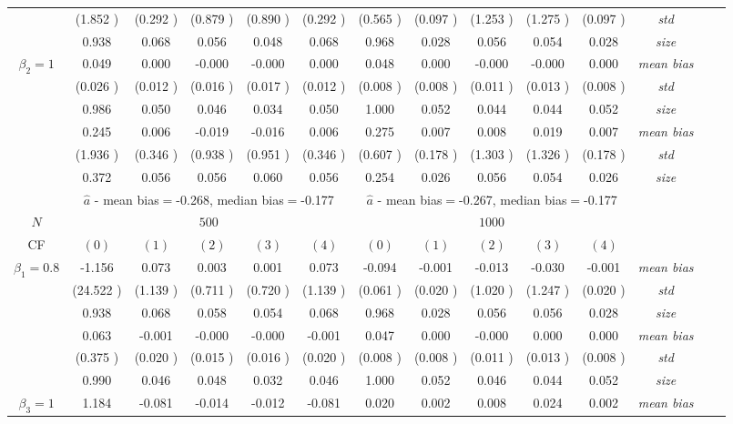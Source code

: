\begin{table}
\begin{threeparttable}
{\begin{tabular}{|c|c|c|c|c|c|c|c|c|c|c|c|c|c|}
&(1.852 )&(0.292 )&(0.879 )&(0.890 )&(0.292 )&(0.565 )&(0.097 )&(1.253 )&(1.275 )&(0.097 )&\textit{std}\\ 
& 0.938 & 0.068 &0.056 &0.048 &0.068 &0.968& 0.028 &0.056 &0.054& 0.028 &\textit{size} \\ \midrule 
\multirow{4}{*}{$\beta_2=1$}& 0.049 & 0.000 &-0.000 &-0.000 &0.000 &0.048& 0.000 &-0.000 &-0.000& 0.000 &\textit{mean bias} \\ 
&(0.026 )&(0.012 )&(0.016 )&(0.017 )&(0.012 )&(0.008 )&(0.008 )&(0.011 )&(0.013 )&(0.008 )&\textit{std}\\ 
& 0.986 & 0.050 &0.046 &0.034 &0.050 &1.000& 0.052 &0.044& 0.044 &0.052 &\textit{size} \\\midrule 
\multirow{4}{*}{$\beta_3=1$}& 0.245 & 0.006 &-0.019& -0.016 &0.006 &0.275 &0.007 &0.008 &0.019& 0.007 &\textit{mean bias} \\ 
&(1.936 )&(0.346 )&(0.938 )&(0.951 )&(0.346 )&(0.607 )&(0.178 )&(1.303 )&(1.326 )&(0.178 )&\textit{std}\\ 
& 0.372 & 0.056 &0.056 &0.060 &0.056 &0.254& 0.026& 0.056 &0.054 &0.026 &\textit{size} \\\midrule 
&\multicolumn{5}{|c|}{$\hat{a}$ - mean bias$=$-0.268, median bias$=$-0.177 }&\multicolumn{5}{|c|}{$\hat{a}$ - mean bias$=$-0.267, median bias$=$-0.177 }&\\ \hline 
\cellcolor{yellow}$N$&\multicolumn{5}{|c|}{\cellcolor{yellow}$500$}&\multicolumn{5}{|c|}{\cellcolor{yellow}$1000$}&\\\hline 
CF&$(0)$&$(1)$&$(2)$&$(3)$&$(4)$& $(0)$ &$(1)$&$(2)$&$(3)$&$(4)$&\\\hline 
\multirow{4}{*}{$\beta_1=0.8$}& -1.156 & 0.073 &0.003 &0.001 &0.073 &-0.094& -0.001 &-0.013 &-0.030& -0.001 &\textit{mean bias} \\ 
&(24.522 )&(1.139 )&(0.711 )&(0.720 )&(1.139 )&(0.061 )&(0.020 )&(1.020 )&(1.247 )&(0.020 )&\textit{std}\\ 
& 0.938 & 0.068 &0.058 &0.054 &0.068 &0.968& 0.028 &0.056 &0.056& 0.028 &\textit{size} \\\midrule 
\multirow{4}{*}{$\beta_2=1$}& 0.063 & -0.001 &-0.000 &-0.000 &-0.001 &0.047& 0.000 &-0.000 &0.000& 0.000 &\textit{mean bias} \\ 
&(0.375 )&(0.020 )&(0.015 )&(0.016 )&(0.020 )&(0.008 )&(0.008 )&(0.011 )&(0.013 )&(0.008 )&\textit{std}\\ 
& 0.990 & 0.046 &0.048 &0.032 &0.046 &1.000& 0.052 &0.046& 0.044 &0.052 &\textit{size} \\ \midrule
\multirow{4}{*}{$\beta_3=1$}& 1.184 & -0.081 &-0.014& -0.012 &-0.081 &0.020 &0.002 &0.008 &0.024& 0.002 &\textit{mean bias} \\ 

\end{tabular}}
\end{threeparttable}
\end{table}
